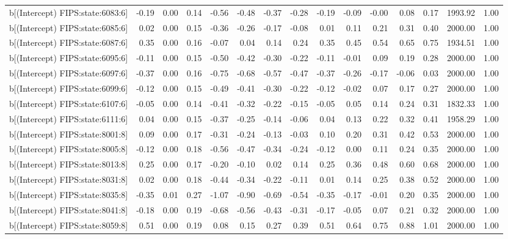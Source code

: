 \begin{table}[ht]
\begin{tabular}{rrrrrrrrrrrrrrr}
  b[(Intercept) FIPS:state:6083:6] & -0.19 & 0.00 & 0.14 & -0.56 & -0.48 & -0.37 & -0.28 & -0.19 & -0.09 & -0.00 & 0.08 & 0.17 & 1993.92 & 1.00 \\ 
  b[(Intercept) FIPS:state:6085:6] & 0.02 & 0.00 & 0.15 & -0.36 & -0.26 & -0.17 & -0.08 & 0.01 & 0.11 & 0.21 & 0.31 & 0.40 & 2000.00 & 1.00 \\ 
  b[(Intercept) FIPS:state:6087:6] & 0.35 & 0.00 & 0.16 & -0.07 & 0.04 & 0.14 & 0.24 & 0.35 & 0.45 & 0.54 & 0.65 & 0.75 & 1934.51 & 1.00 \\ 
  b[(Intercept) FIPS:state:6095:6] & -0.11 & 0.00 & 0.15 & -0.50 & -0.42 & -0.30 & -0.22 & -0.11 & -0.01 & 0.09 & 0.19 & 0.28 & 2000.00 & 1.00 \\ 
  b[(Intercept) FIPS:state:6097:6] & -0.37 & 0.00 & 0.16 & -0.75 & -0.68 & -0.57 & -0.47 & -0.37 & -0.26 & -0.17 & -0.06 & 0.03 & 2000.00 & 1.00 \\ 
  b[(Intercept) FIPS:state:6099:6] & -0.12 & 0.00 & 0.15 & -0.49 & -0.41 & -0.30 & -0.22 & -0.12 & -0.02 & 0.07 & 0.17 & 0.27 & 2000.00 & 1.00 \\ 
  b[(Intercept) FIPS:state:6107:6] & -0.05 & 0.00 & 0.14 & -0.41 & -0.32 & -0.22 & -0.15 & -0.05 & 0.05 & 0.14 & 0.24 & 0.31 & 1832.33 & 1.00 \\ 
  b[(Intercept) FIPS:state:6111:6] & 0.04 & 0.00 & 0.15 & -0.37 & -0.25 & -0.14 & -0.06 & 0.04 & 0.13 & 0.22 & 0.32 & 0.41 & 1958.29 & 1.00 \\ 
  b[(Intercept) FIPS:state:8001:8] & 0.09 & 0.00 & 0.17 & -0.31 & -0.24 & -0.13 & -0.03 & 0.10 & 0.20 & 0.31 & 0.42 & 0.53 & 2000.00 & 1.00 \\ 
  b[(Intercept) FIPS:state:8005:8] & -0.12 & 0.00 & 0.18 & -0.56 & -0.47 & -0.34 & -0.24 & -0.12 & 0.00 & 0.11 & 0.24 & 0.35 & 2000.00 & 1.00 \\ 
  b[(Intercept) FIPS:state:8013:8] & 0.25 & 0.00 & 0.17 & -0.20 & -0.10 & 0.02 & 0.14 & 0.25 & 0.36 & 0.48 & 0.60 & 0.68 & 2000.00 & 1.00 \\ 
  b[(Intercept) FIPS:state:8031:8] & 0.02 & 0.00 & 0.18 & -0.44 & -0.34 & -0.22 & -0.11 & 0.01 & 0.14 & 0.25 & 0.38 & 0.52 & 2000.00 & 1.00 \\ 
  b[(Intercept) FIPS:state:8035:8] & -0.35 & 0.01 & 0.27 & -1.07 & -0.90 & -0.69 & -0.54 & -0.35 & -0.17 & -0.01 & 0.20 & 0.35 & 2000.00 & 1.00 \\ 
  b[(Intercept) FIPS:state:8041:8] & -0.18 & 0.00 & 0.19 & -0.68 & -0.56 & -0.43 & -0.31 & -0.17 & -0.05 & 0.07 & 0.21 & 0.32 & 2000.00 & 1.00 \\ 
  b[(Intercept) FIPS:state:8059:8] & 0.51 & 0.00 & 0.19 & 0.08 & 0.15 & 0.27 & 0.39 & 0.51 & 0.64 & 0.75 & 0.88 & 1.01 & 2000.00 & 1.00 \\ 

\end{tabular}
\end{table}
